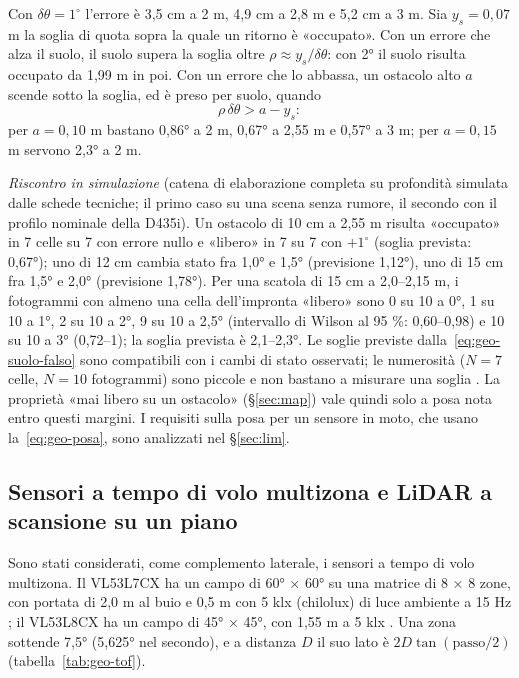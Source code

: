 Con $\delta\theta=1^\circ$ l'errore è 3,5 cm a 2 m, 4,9 cm a 2,8 m e 5,2 cm a 3 m. Sia $y_s=0{,}07$ m la soglia di quota sopra la quale un ritorno è «occupato». Con un errore che alza il suolo, il suolo supera la soglia oltre $\rho\approx y_s/\delta\theta$: con 2° il suolo risulta occupato da 1,99 m in poi. Con un errore che lo abbassa, un ostacolo alto $a$ scende sotto la soglia, ed è preso per suolo, quando
\begin{equation}\label{eq:geo-suolo-falso}
\rho\,\delta\theta>a-y_s :
\end{equation}
per $a=0{,}10$ m bastano 0,86° a 2 m, 0,67° a 2,55 m e 0,57° a 3 m; per $a=0{,}15$ m servono 2,3° a 2 m.

\emph{Riscontro in simulazione} (catena di elaborazione completa su profondità simulata dalle schede tecniche; il primo caso su una scena senza rumore, il secondo con il profilo nominale della D435i). Un ostacolo di 10 cm a 2,55 m risulta «occupato» in 7 celle su 7 con errore nullo e «libero» in 7 su 7 con $+1^\circ$ (soglia prevista: 0,67°); uno di 12 cm cambia stato fra 1,0° e 1,5° (previsione 1,12°), uno di 15 cm fra 1,5° e 2,0° (previsione 1,78°). Per una scatola di 15 cm a 2,0--2,15 m, i fotogrammi con almeno una cella dell'impronta «libero» sono 0 su 10 a 0°, 1 su 10 a 1°, 2 su 10 a 2°, 9 su 10 a 2,5° (intervallo di Wilson al 95 \%: 0,60--0,98) e 10 su 10 a 3° (0,72--1); la soglia prevista è 2,1--2,3°. Le soglie previste dalla~\eqref{eq:geo-suolo-falso} sono compatibili con i cambi di stato osservati; le numerosità ($N=7$ celle, $N=10$ fotogrammi) sono piccole e non bastano a misurare una soglia . La proprietà «mai libero su un ostacolo» (\S\ref{sec:map}) vale quindi solo a posa nota entro questi margini. I requisiti sulla posa per un sensore in moto, che usano la~\eqref{eq:geo-posa}, sono analizzati nel \S\ref{sec:lim}.

\subsection{Sensori a tempo di volo multizona e LiDAR a scansione su un piano}\label{sec:geo-altri}

Sono stati considerati, come complemento laterale, i sensori a tempo di volo multizona. Il VL53L7CX ha un campo di 60° × 60° su una matrice di 8 × 8 zone, con portata di 2,0 m al buio e 0,5 m con 5 klx (chilolux) di luce ambiente a 15 Hz \cite{st-vl53l7cx}; il VL53L8CX ha un campo di 45° × 45°, con 1,55 m a 5 klx \cite{st-vl53l8cx}. Una zona sottende 7,5° (5,625° nel secondo), e a distanza $D$ il suo lato è $2D\tan(\text{passo}/2)$ (tabella~\ref{tab:geo-tof}).

